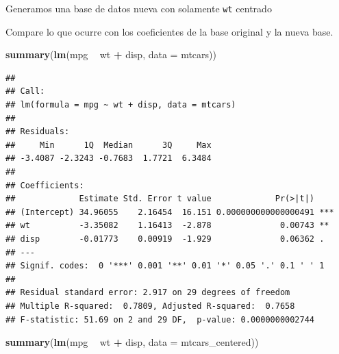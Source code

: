 \documentclass[
  12pt,
]{book}
\newenvironment{Shaded}{\begin{snugshade}}{\end{snugshade}}
\newcommand{\CommentTok}[1]{\textcolor[rgb]{0.56,0.35,0.01}{\textit{#1}}}
\newcommand{\DataTypeTok}[1]{\textcolor[rgb]{0.13,0.29,0.53}{#1}}
\newcommand{\KeywordTok}[1]{\textcolor[rgb]{0.13,0.29,0.53}{\textbf{#1}}}
\newcommand{\NormalTok}[1]{#1}
\newcommand{\OperatorTok}[1]{\textcolor[rgb]{0.81,0.36,0.00}{\textbf{#1}}}
\newcommand{\OtherTok}[1]{\textcolor[rgb]{0.56,0.35,0.01}{#1}}
\newcommand{\StringTok}[1]{\textcolor[rgb]{0.31,0.60,0.02}{#1}}
\theoremstyle{definition}
\theoremstyle{definition}
\theoremstyle{definition}
\theoremstyle{remark}
\begin{document}
Generamos una base de datos nueva con solamente \texttt{wt} centrado

\begin{Shaded}
\end{Shaded}

Compare lo que ocurre con los coeficientes de la base original y la nueva base.

\begin{Shaded}
\begin{Highlighting}[]
\KeywordTok{summary}\NormalTok{(}\KeywordTok{lm}\NormalTok{(mpg }\OperatorTok{~}\StringTok{ }\NormalTok{wt }\OperatorTok{+}\StringTok{ }\NormalTok{disp, }\DataTypeTok{data =}\NormalTok{ mtcars))}
\end{Highlighting}
\end{Shaded}

\begin{verbatim}
## 
## Call:
## lm(formula = mpg ~ wt + disp, data = mtcars)
## 
## Residuals:
##     Min      1Q  Median      3Q     Max 
## -3.4087 -2.3243 -0.7683  1.7721  6.3484 
## 
## Coefficients:
##             Estimate Std. Error t value             Pr(>|t|)    
## (Intercept) 34.96055    2.16454  16.151 0.000000000000000491 ***
## wt          -3.35082    1.16413  -2.878              0.00743 ** 
## disp        -0.01773    0.00919  -1.929              0.06362 .  
## ---
## Signif. codes:  0 '***' 0.001 '**' 0.01 '*' 0.05 '.' 0.1 ' ' 1
## 
## Residual standard error: 2.917 on 29 degrees of freedom
## Multiple R-squared:  0.7809, Adjusted R-squared:  0.7658 
## F-statistic: 51.69 on 2 and 29 DF,  p-value: 0.0000000002744
\end{verbatim}

\begin{Shaded}
\begin{Highlighting}[]
\KeywordTok{summary}\NormalTok{(}\KeywordTok{lm}\NormalTok{(mpg }\OperatorTok{~}\StringTok{ }\NormalTok{wt }\OperatorTok{+}\StringTok{ }\NormalTok{disp, }\DataTypeTok{data =}\NormalTok{ mtcars_centered))}
\end{Highlighting}
\end{Shaded}
\end{document}
